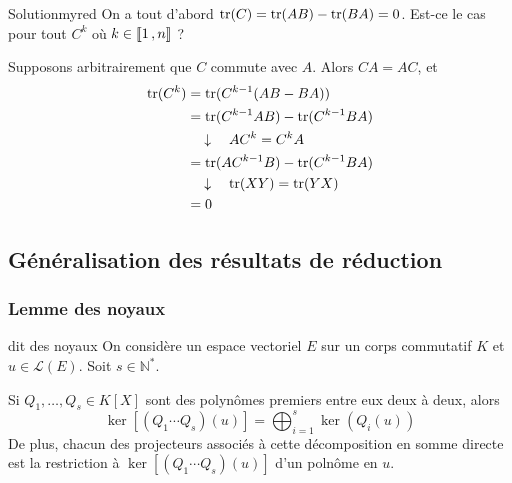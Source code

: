     \begin{demo}{Solution}{myred}
        On a tout d’abord $\operatorname{tr}(C) = \operatorname{tr}(AB) - \operatorname{tr}(BA) = 0$. Est-ce le cas pour tout $C^k$ où $k \in \left\llbracket 1 \, , n \right\rrbracket$ ? 

        Supposons arbitrairement que $C$ commute avec $A$. Alors $CA = AC$, et
        \begin{align*}
            \operatorname{tr}(C^k) 
            &= \operatorname{tr}(C^{k-1}(AB - BA)) \\
            &= \operatorname{tr}(C^{k-1} AB) - \operatorname{tr}(C^{k-1} BA) \\
            &\quad \downarrow \quad A C^k = C^k A \\
            &= \operatorname{tr}(A C^{k-1} B) - \operatorname{tr}(C^{k-1} BA) \\ 
            &\quad \downarrow \quad \operatorname{tr}(XY) = \operatorname{tr}(YX) \\
            &= 0
        \end{align*} 
    \end{demo}

\subsection{Généralisation des résultats de réduction}

    \subsubsection{Lemme des noyaux}

    \begin{lem}{dit des noyaux}{}
        On considère un espace vectoriel $E$ sur un corps commutatif $K$ et $u \in \mathcal{L}(E)$. Soit $s \in \mathbb{N}^*$.

        Si $Q_1,\ldots,Q_s \in K[X]$ sont des polynômes premiers entre eux deux à deux, alors 
        \[ \ker\left[(Q_1\cdots Q_s)(u)\right] = \bigoplus_{i=1}^s \ker(Q_i(u)) \]
        De plus, chacun des projecteurs associés à cette décomposition en somme directe est la restriction à $\ker\left[(Q_1\cdots Q_s)(u)\right]$ d’un polnôme en $u$.
    \end{lem}

